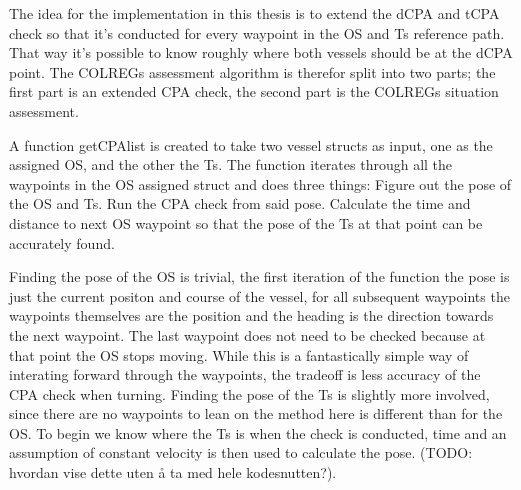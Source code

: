 The idea for the implementation in this thesis is to extend the \gls{dCPA} and \gls{tCPA} check so that it's conducted for every waypoint in the \gls{OS} and \gls{Ts} reference path.
That way it's possible to know roughly where both vessels should be at the \gls{dCPA} point. The COLREGs assessment
algorithm is therefor split into two parts; the first part is an extended CPA check, the second part is the COLREGs situation assessment. 

A function getCPAlist is created to take two vessel structs as input, one as the assigned \gls{OS}, and the other the \gls{Ts}. The function iterates through all the waypoints
in the \gls{OS} assigned struct and does three things:\newline
Figure out the pose of the \gls{OS} and \gls{Ts}.\newline
Run the CPA check from said pose.\newline
Calculate the time and distance to next \gls{OS} waypoint so that the pose of the \gls{Ts} at that point can be accurately found.

Finding the pose of the \gls{OS} is trivial, the first iteration of the function the pose is just the current positon and course of the vessel, for all
subsequent waypoints the waypoints themselves are the position and the heading is the direction towards the next waypoint. The last waypoint does not need to be checked
because at that point the \gls{OS} stops moving. While this is a fantastically simple way of interating forward through the waypoints, the tradeoff is less accuracy of the CPA check
when turning. 
Finding the pose of the \gls{Ts} is slightly more involved, since there are no waypoints to lean on the method here is different than for the \gls{OS}.
To begin we know where the \gls{Ts} is when the check is conducted, time and an assumption of constant velocity is then used to calculate the pose.
(TODO: hvordan vise dette uten å ta med hele kodesnutten?).

